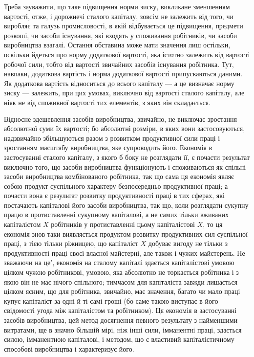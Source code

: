 Треба зауважити, що таке підвищення норми зиску, викликане
зменшенням вартості, отже, і дорожнечі сталого капіталу,
зовсім не залежить від того, чи виробляє та галузь промисловості,
в якій відбувається це підвищення, предмети розкоші,
чи засоби існування, які входять у споживання робітників, чи
засоби виробництва взагалі. Остання обставина може мати значення
лиш остільки, оскільки йдеться про норму додаткової
вартості, яка істотно залежить від вартості робочої сили, тобто
від вартості звичайних засобів існування робітника. Тут, навпаки,
додаткова вартість і норма додаткової вартості припускаються
даними. Як додаткова вартість відноситься до всього
капіталу — а це визначає норму зиску — залежить, при цих
умовах, виключно від вартості сталого капіталу, але ніяк не
від споживної вартості тих елементів, з яких він складається.

Відносне здешевлення засобів виробництва, звичайно, не виключає
зростання абсолютної суми їх вартості; бо абсолютні
розміри, в яких вони застосовуються, надзвичайно збільшуються
разом з розвитком продуктивної сили праці і зростанням масштабу
виробництва, яке супроводить його. Економія в застосуванні
сталого капіталу, з якого б боку не розглядати її, є почасти
результат виключно того, що засоби виробництва функціонують
і споживаються як спільні засоби виробництва комбінованого
робітника, так що сама ця економія являє собою продукт суспільного
характеру безпосередньо продуктивної праці; а почасти
вона є результат розвитку продуктивності праці в тих
сферах, які постачають капіталові його засоби виробництва, так
що, коли розглядати сукупну працю в протиставленні сукупному
капіталові, а не самих тільки вживаних капіталістом $X$ робітників
у протиставленні цьому капіталістові $X$, то ця економія
знов таки виявляється продуктом розвитку продуктивних сил
суспільної праці, з тією тільки ріжницею, що капіталіст $X$ добуває
вигоду не тільки з продуктивності праці своєї власної
майстерні, але також і чужих майстерень. Не зважаючи на це',
економія на сталому капіталі здається капіталістові умовою
цілком чужою робітникові, умовою, яка абсолютно не торкається
робітника і з якою він не має нічого спільного; тимчасом
для капіталіста завжди лишається цілком ясним, що для
робітника, звичайно, має значення, багато чи мало праці купує
капіталіст за одні й ті самі гроші (бо саме такою виступає в його
свідомості угода між капіталістом та робітником). Ця економія
в застосуванні засобів виробництва, цей метод досягнення певного
результату з найменшими витратами, ще в значно більшій
мірі, ніж інші сили, імманентні праці, здається силою, імманентною
капіталові, і методом, що є властивий капіталістичному способові
виробництва і характеризує його.

